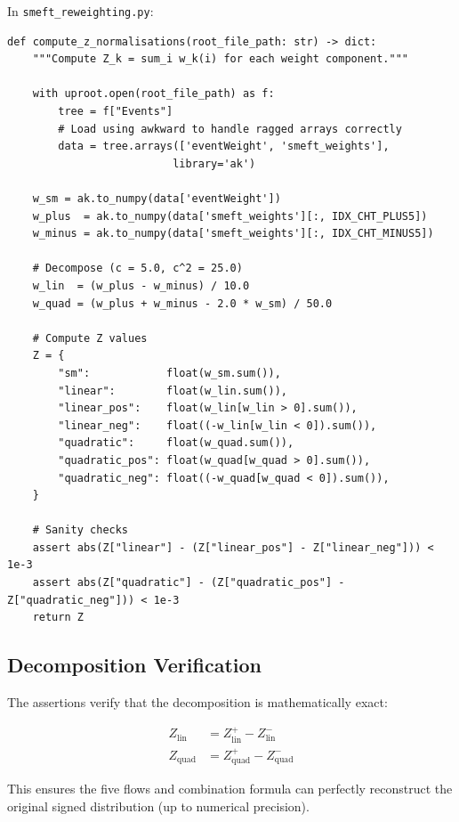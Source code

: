 \documentclass[11pt,a4paper]{article}
\begin{document}
In \texttt{smeft\_reweighting.py}:

\begin{lstlisting}
def compute_z_normalisations(root_file_path: str) -> dict:
    """Compute Z_k = sum_i w_k(i) for each weight component."""
    
    with uproot.open(root_file_path) as f:
        tree = f["Events"]
        # Load using awkward to handle ragged arrays correctly
        data = tree.arrays(['eventWeight', 'smeft_weights'], 
                          library='ak')
    
    w_sm = ak.to_numpy(data['eventWeight'])
    w_plus  = ak.to_numpy(data['smeft_weights'][:, IDX_CHT_PLUS5])
    w_minus = ak.to_numpy(data['smeft_weights'][:, IDX_CHT_MINUS5])
    
    # Decompose (c = 5.0, c^2 = 25.0)
    w_lin  = (w_plus - w_minus) / 10.0
    w_quad = (w_plus + w_minus - 2.0 * w_sm) / 50.0
    
    # Compute Z values
    Z = {
        "sm":            float(w_sm.sum()),
        "linear":        float(w_lin.sum()),
        "linear_pos":    float(w_lin[w_lin > 0].sum()),
        "linear_neg":    float((-w_lin[w_lin < 0]).sum()),
        "quadratic":     float(w_quad.sum()),
        "quadratic_pos": float(w_quad[w_quad > 0].sum()),
        "quadratic_neg": float((-w_quad[w_quad < 0]).sum()),
    }
    
    # Sanity checks
    assert abs(Z["linear"] - (Z["linear_pos"] - Z["linear_neg"])) < 1e-3
    assert abs(Z["quadratic"] - (Z["quadratic_pos"] - Z["quadratic_neg"])) < 1e-3
    return Z
\end{lstlisting}

\subsection{Decomposition Verification}

The assertions verify that the decomposition is mathematically exact:

\begin{equation}
\begin{aligned}
Z_{\text{lin}} &= Z_{\text{lin}}^+ - Z_{\text{lin}}^- \\
Z_{\text{quad}} &= Z_{\text{quad}}^+ - Z_{\text{quad}}^-
\end{aligned}
\end{equation}

This ensures the five flows and combination formula can perfectly reconstruct the original signed distribution 
(up to numerical precision).
\end{document}
